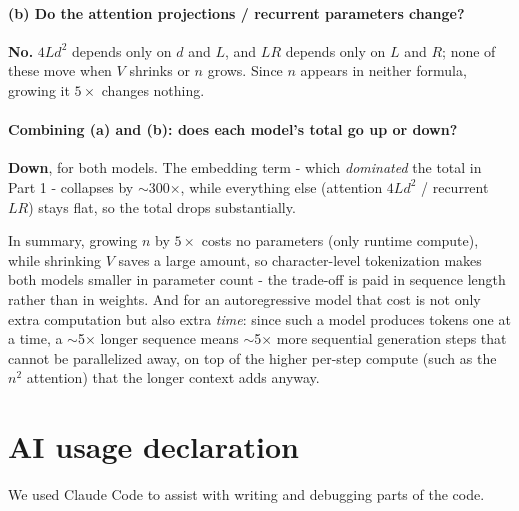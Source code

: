 \documentclass[11pt]{article}
\begin{document}
\paragraph{(b) Do the attention projections / recurrent parameters change?}
\textbf{No.} $4Ld^2$ depends only on $d$ and $L$, and $LR$ depends only on $L$
and $R$; none of these move when $V$ shrinks or $n$ grows. Since $n$ appears in
neither formula, growing it $5\times$ changes nothing.

\paragraph{Combining (a) and (b): does each model's total go up or down?}
\textbf{Down}, for both models. The embedding term - which \emph{dominated} the
total in Part 1 - collapses by $\sim$300$\times$, while everything else
(attention $4Ld^2$ / recurrent $LR$) stays flat, so the total drops
substantially.

In summary, growing $n$ by $5\times$ costs no parameters (only runtime compute),
while shrinking $V$ saves a large amount, so character-level tokenization makes
both models smaller in parameter count - the trade-off is paid in sequence
length rather than in weights. And for an autoregressive model that cost is not
only extra computation but also extra \emph{time}: since such a model produces
tokens one at a time, a $\sim$5$\times$ longer sequence means $\sim$5$\times$
more sequential generation steps that cannot be parallelized away, on top of the
higher per-step compute (such as the $n^2$ attention) that the longer context
adds anyway.

\section*{AI usage declaration}

We used Claude Code to assist with writing and debugging parts of the code.
\end{document}
